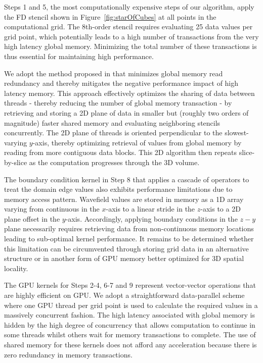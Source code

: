 Steps 1 and 5, the most computationally expensive steps of our algorithm, apply the FD stencil shown in Figure~\ref{fig:starOfCubes} at all points in the computational grid.  The 8th-order stencil requires evaluating 25 data values per grid point, which potentially leads to a high number of transactions from the very high latency  global memory. Minimizing the total number of these transactions is thus essential for maintaining high performance.  

We adopt the method proposed in \cite{Micikevicius} that minimizes global memory read redundancy and thereby mitigates the negative performance impact of high latency memory.  This approach effectively optimizes the sharing of data between threads -  thereby reducing the number of global memory transaction -  by retrieving and storing a 2D plane of data in smaller but (roughly two orders of magnitude) faster shared memory and evaluating neighboring stencils concurrently.  The 2D plane of threads is oriented perpendicular to the slowest-varying $y$-axis, thereby optimizing retrieval of values from global memory by reading from more contiguous data blocks.  This 2D algorithm then repeats slice-by-slice as the computation progresses through the 3D volume. 

The boundary condition kernel in Step 8 that applies a cascade of operators to treat the domain edge values also exhibits performance limitations due to memory access pattern.  Wavefield values are stored in memory as a 1D array varying from continuous in the $x$-axis to a linear stride in the $z$-axis to a 2D plane offset in the $y$-axis.  Accordingly, applying boundary conditions in the $z-y$ plane necessarily requires retrieving data from non-continuous memory locations leading to sub-optimal kernel performance.  It remains to be determined whether this limitation can be circumvented through storing grid data in an alternative structure or in another form of GPU memory better optimized for 3D spatial locality.

The GPU kernels for Steps 2-4, 6-7 and 9 represent vector-vector operations that are highly efficient on GPU.  We adopt a straightforward data-parallel scheme where one GPU thread per grid point is used to calculate the required values in a massively concurrent fashion.  The high latency associated with global memory is hidden by the high degree of concurrency that allows computation to continue in some threads whilst others wait for memory transactions to complete.  The use of shared memory for these kernels does not afford any acceleration because there is zero redundancy in memory transactions.  

